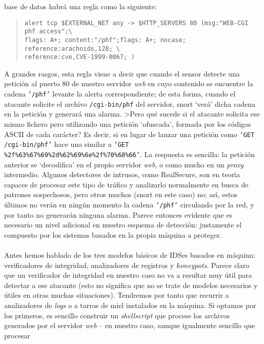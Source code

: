 base de datos habr\'a una regla como la siguiente:
\begin{quote}
\begin{verbatim}
alert tcp $EXTERNAL_NET any -> $HTTP_SERVERS 80 (msg:"WEB-CGI phf access";\
flags: A+; content:"/phf";flags: A+; nocase; reference:arachnids,128; \
reference:cve,CVE-1999-0067; )
\end{verbatim}
\end{quote}
A grandes rasgos, esta regla viene a decir que cuando el sensor detecte una 
petici\'on al puerto 80 de nuestro servidor {\it web} en cuyo contenido se 
encuentre la cadena {\tt `/phf'} levante la alerta correspondiente; de esta 
forma, cuando el atacante solicite el archivo {\tt /cgi-bin/phf} del servidor,
{\sc snort} `ver\'a' dicha cadena en la petici\'on y generar\'a una alarma. 
>Pero qu\'e sucede si el atacante solicita ese mismo fichero pero utilizando 
una petici\'on `ofuscada', formada por los c\'odigos ASCII de cada car\'acter?
Es decir, si en lugar de lanzar una petici\'on como {\tt `GET /cgi-bin/phf'} 
hace una similar a {\tt `GET \%2f\%63\%67\%69\%2d\%62\%69\%6e\%2f\%70\%68\%66'}.
La respuesta es sencilla: la petici\'on anterior se `decodifica' en el propio
servidor {\it web}, o como mucho en un {\it proxy} intermedio. Algunos 
detectores de intrusos, como RealSecure, son
en teor\'{\i}a capaces de procesar este tipo de tr\'afico y analizarlo 
normalmente en busca de patrones sospechosos, pero otros muchos ({\sc snort} en 
este caso) no; as\'{\i}, estos \'ultimos no ver\'an en ning\'un 
momento la cadena {\tt `/phf'} circulando por la red, y por tanto no 
generar\'an ninguna alarma. Parece entonces evidente que es
necesario un nivel adicional en nuestro esquema de detecci\'on: justamente el
compuesto por los sistemas basados en la propia m\'aquina a proteger.\\
\\Antes hemos hablado de los tres modelos b\'asicos de IDSes basados en 
m\'aquina: verificadores de integridad, analizadores de registros y {\it
honeypots}. Parece claro que un verificador de integridad en nuestro caso no va
a resultar muy \'util para detectar a ese atacante (esto no significa que no
se trate de modelos necesarios y \'utiles en otras muchas situaciones). 
Tendremos por tanto que recurrir a analizadores de {\it logs} o a tarros de 
miel instalados en la m\'aquina. Si optamos por los primeros, es sencillo
construir un {\it shellscript} que procese los archivos generados por el
servidor {\it web} -- en nuestro caso, aunque igualmente sencillo que procesar 
